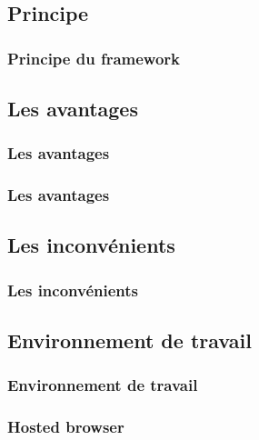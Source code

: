 \subsection{Principe}
\begin{frame}\frametitle{Principe du framework}
\end{frame}
\subsection{Les avantages}
\begin{frame}\frametitle{Les avantages}
\end{frame}
 \begin{frame}\frametitle{Les avantages}
\end{frame}
\subsection{Les inconvénients}
\begin{frame}\frametitle{Les inconvénients}
\end{frame}
\subsection{Environnement de travail}
\begin{frame}\frametitle{Environnement de travail}
\end{frame}
\begin{frame}\frametitle{Hosted browser}
\end{frame}
